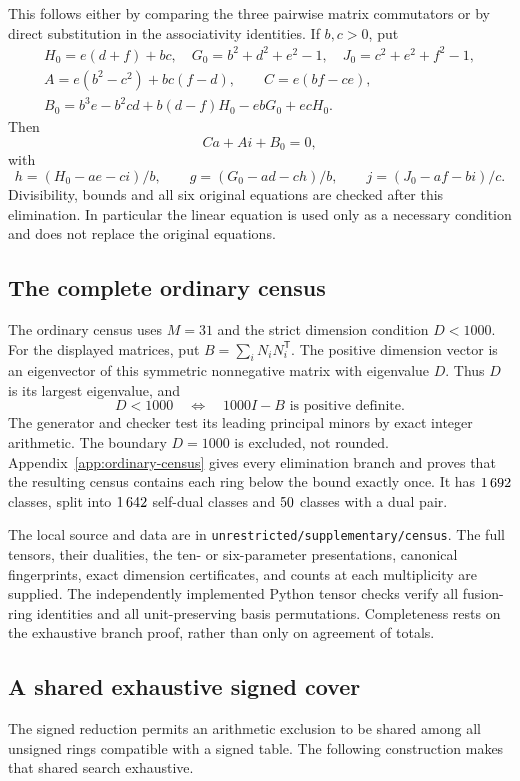 This follows either by comparing the three pairwise matrix commutators
or by direct substitution in the associativity identities.  If $b,c>0$, put
\begin{gather*}
 H_0=e(d+f)+bc,\quad G_0=b^2+d^2+e^2-1,\quad J_0=c^2+e^2+f^2-1,\\
 A=e(b^2-c^2)+bc(f-d),\qquad C=e(bf-ce),\\
 B_0=b^3e-b^2cd+b(d-f)H_0-ebG_0+ecH_0.
\end{gather*}
Then
\begin{equation}\label{finite:eq:census-linear}
 Ca+Ai+B_0=0,
\end{equation}
with
\[
 h=(H_0-ae-ci)/b,\qquad g=(G_0-ad-ch)/b,
 \qquad j=(J_0-af-bi)/c.
\]
Divisibility, bounds and all six original equations are checked after
this elimination.  In particular the linear equation is used only as a
necessary condition and does not replace the original equations.
\subsection{The complete ordinary census}\label{finite:sec:ordinary-census}
The ordinary census uses $M=31$ and the strict dimension condition $D<1000$.
For the displayed matrices, put $B=\sum_i N_iN_i^{\mathsf T}$.
The positive dimension vector is an eigenvector of this symmetric
nonnegative matrix with eigenvalue $D$. Thus $D$ is its largest eigenvalue,
and
\[
 D<1000\quad\Longleftrightarrow\quad 1000I-B\text{ is positive definite}.
\]
The generator and checker test its leading principal minors by exact integer
arithmetic. The boundary $D=1000$ is excluded, not rounded.
Appendix~\ref{app:ordinary-census} gives every elimination branch and proves
that the resulting census contains each ring below the bound exactly once.
It has $1\,692$ classes, split into $1\,642$ self-dual classes
and $50$ classes with a dual pair.

The local source and data are in \texttt{unrestricted/supplementary/census}.
The full tensors, their dualities, the ten- or six-parameter presentations,
canonical fingerprints, exact dimension certificates, and counts at each
multiplicity are supplied. The independently implemented Python tensor
checks verify all fusion-ring identities and all unit-preserving basis
permutations. Completeness rests on the exhaustive branch proof, rather
than only on agreement of totals.

\subsection{A shared exhaustive signed cover}\label{finite:sec:shared-signed-cover}
The signed reduction permits an arithmetic exclusion to be shared among
all unsigned rings compatible with a signed table. The following
construction makes that shared search exhaustive.

